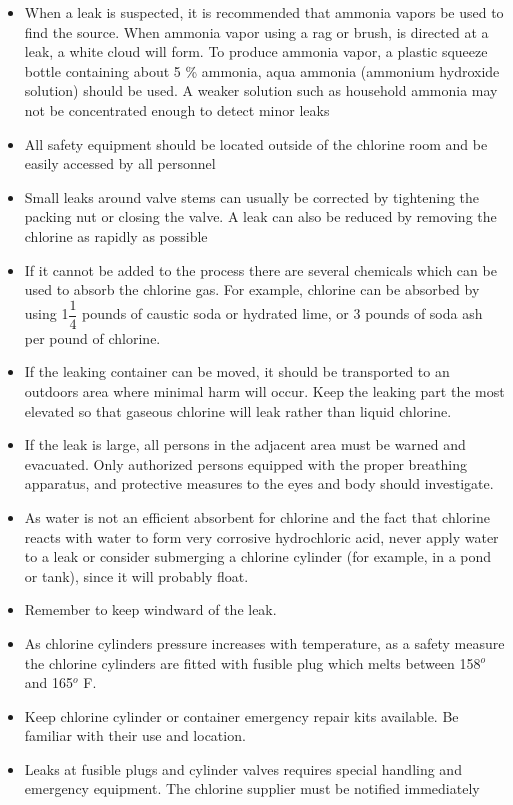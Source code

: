 \begin{itemize}
	\item When a leak is suspected, it is recommended that ammonia vapors be used to find the source. When ammonia vapor using a rag or brush, is directed at a leak, a white cloud will form. To produce ammonia vapor, a plastic squeeze bottle containing about 5 \% ammonia, aqua ammonia (ammonium hydroxide solution) should be used. A weaker solution such as household ammonia may not be concentrated enough to detect minor leaks
	\item All safety equipment should be located outside of the chlorine room and be easily accessed by all personnel
	\item Small leaks around valve stems can usually be corrected by tightening the packing nut or closing the valve. A leak can also be reduced by removing the chlorine as rapidly as possible
	\item If it cannot be added to the process there are several chemicals which can be used to absorb the chlorine gas. For example, chlorine can be absorbed by using 1$\dfrac{1}{4}$ pounds of caustic soda or hydrated lime, or 3 pounds of soda ash per pound of chlorine. 
	\item If the leaking container can be moved, it should be transported to an outdoors area where minimal harm will occur. Keep the leaking part the most elevated so that gaseous chlorine will leak rather than liquid chlorine.
	\item If the leak is large, all persons in the adjacent area must be warned and evacuated. Only authorized persons equipped with the proper breathing apparatus, and protective measures to the eyes and body should investigate. 
	\item As water is not an efficient absorbent for chlorine and the fact that chlorine reacts with water to form very corrosive hydrochloric acid, never apply water to a leak or consider submerging a chlorine cylinder (for example, in a pond or tank), since it will probably float.
	\item Remember to keep windward of the leak.
	\item As chlorine cylinders pressure increases with temperature, as a safety measure the chlorine cylinders are fitted with fusible plug  which melts between 158$^o$ and 165$^o$ F.
	\item Keep chlorine cylinder or container emergency repair kits available. Be familiar with their use and location.
	\item Leaks at fusible plugs and cylinder valves requires special handling and emergency equipment. The chlorine supplier must be notified immediately

\end{itemize}

